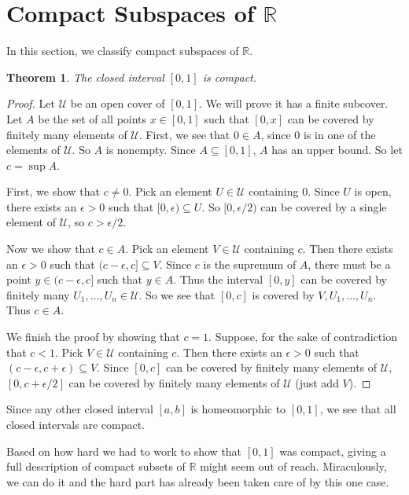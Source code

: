 \documentclass[a4paper]{article}
\newtheorem{theorem}{Theorem}
\numberwithin{theorem}{section}
\begin{document}
\section{Compact Subspaces of $\mathbb{R}$}

In this section, we classify compact subspaces of $\mathbb{R}$.

\begin{theorem}
The closed interval $[0,1]$ is compact.
\end{theorem}

\begin{proof}
Let $\mathcal{U}$ be an open cover of $[0,1]$. We will prove it has a finite subcover. Let $A$ be the set of all points $x \in [0,1]$ such that $[0,x]$ can be covered by finitely many elements of $\mathcal{U}$. First, we see that $0 \in A$, since $0$ is in one of the elements of $\mathcal{U}$. So $A$ is nonempty. Since $A \subseteq [0,1]$, $A$ has an upper bound. So let $c = \sup A$.

First, we show that $c \neq 0$. Pick an element $U \in \mathcal{U}$ containing $0$. Since $U$ is open, there exists an $\epsilon > 0$ such that $[0,\epsilon) \subseteq U$. So $[0,\epsilon / 2)$ can be covered by a single element of $\mathcal{U}$, so $c > \epsilon / 2$.

Now we show that $c \in A$. Pick an element $V \in \mathcal{U}$ containing $c$. Then there exists an $\epsilon > 0$ such that $(c-\epsilon, c] \subseteq V$. Since $c$ is the supremum of $A$, there must be a point $y \in (c-\epsilon, c]$ such that $y \in A$. Thus the interval $[0,y]$ can be covered by finitely many $U_1,\dots,U_n \in \mathcal{U}$. So we see that $[0,c]$ is covered by $V,U_1,\dots,U_n$. Thus $c \in A$.

We finish the proof by showing that $c = 1$. Suppose, for the sake of contradiction that $c < 1$. Pick $V \in \mathcal{U}$ containing $c$. Then there exists an $\epsilon > 0$ such that $(c- \epsilon, c + \epsilon) \subseteq V$. Since $[0,c]$ can be covered by finitely many elements of $\mathcal{U}$, $[0,c + \epsilon / 2]$ can be covered by finitely many elements of $\mathcal{U}$ (just add $V$).

\end{proof}

Since any other closed interval $[a,b]$ is homeomorphic to $[0,1]$, we see that all closed intervals are compact.

Based on how hard we had to work to show that $[0,1]$ was compact, giving a full description of compact subsets of $\mathbb{R}$ might seem out of reach. Miraculously, we can do it and the hard part has already been taken care of by this one case.
\end{document}
